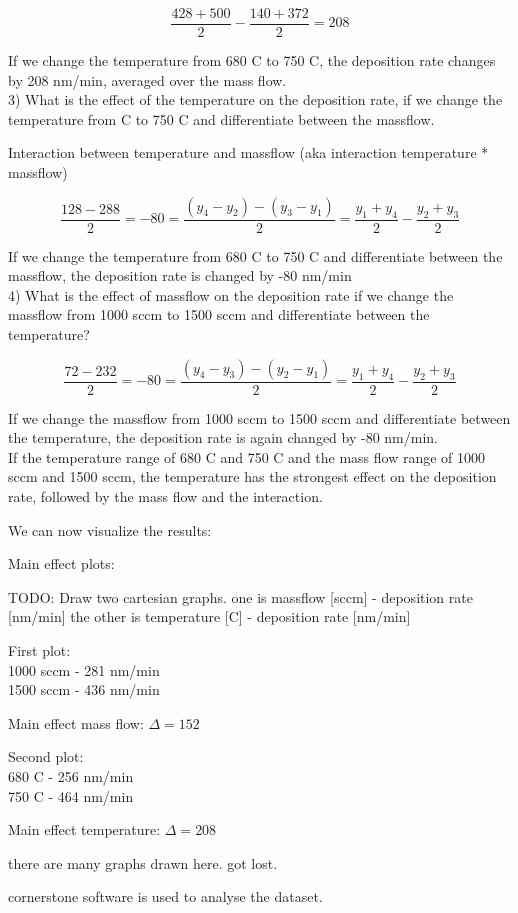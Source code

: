 $$\frac{428 + 500}{2} - \frac{140+372}{2} = 208$$

If we change the temperature from 680 \degree C to 750 \degree C, the deposition rate changes by 208 nm/min, averaged over the mass flow. \\

3) What is the effect of the temperature on the deposition rate, if we change the temperature from \degree C to 750 \degree C and differentiate between the massflow.

Interaction between temperature and massflow (aka interaction temperature * massflow)

$$\frac{128-288}{2} = -80 = \frac{(y_4-y_2) - (y_3-y_1)}{2} = \frac{y_1+y_4}{2} - \frac{y_2+y_3}{2}$$

If we change the temperature from 680 \degree C to 750 \degree C and differentiate between the massflow, the deposition rate is changed by -80 nm/min \\

4) What is the effect of massflow on the deposition rate if we change the massflow from 1000 sccm to 1500 sccm and differentiate between the temperature?

$$\frac{72-232}{2} = -80 = \frac{(y_4-y_3) - (y_2-y_1)}{2} = \frac{y_1+y_4}{2} - \frac{y_2+y_3}{2}$$

If we change the massflow from 1000 sccm to 1500 sccm and differentiate between the temperature, the deposition rate is again changed by -80 nm/min. \\

If the temperature range of 680 \degree C and 750 \degree C and the mass flow range of 1000 sccm and 1500 sccm, the temperature has the strongest effect on the deposition rate, followed by the mass flow and the interaction.

We can now visualize the results:

Main effect plots:

TODO: Draw two cartesian graphs. one is massflow [sccm] - deposition rate [nm/min] the other is temperature [\degree C] - deposition rate [nm/min]
\begin{center}

	First plot:\\
	1000 sccm - 281 nm/min\\
	1500 sccm - 436 nm/min

	Main effect mass flow: $\Delta = 152$

	Second plot:\\
	680 \degree C - 256 nm/min\\
	750 \degree C - 464 nm/min

	Main effect temperature: $\Delta = 208$
\end{center}

there are many graphs drawn here. got lost.

cornerstone software is used to analyse the dataset.
